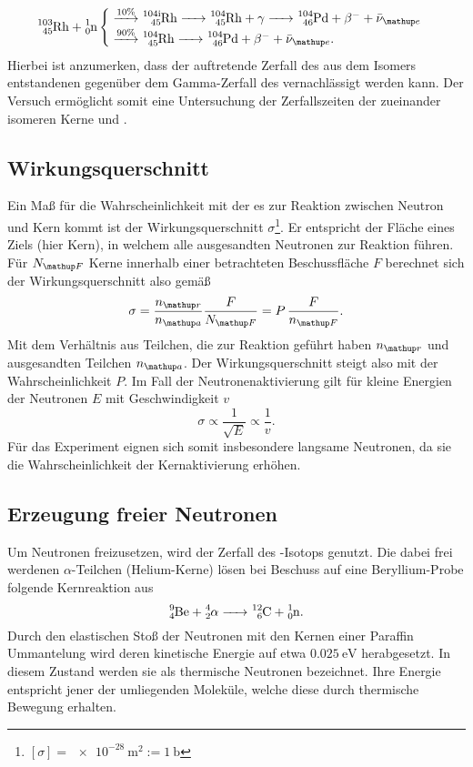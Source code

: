 \begin{equation}
\ce{^103_45 Rh + ^1_0 n} \begin{cases}
\overset{10\%}{\ce{->}} \ce{^{104i}_45 Rh -> ^{104}_45 Rh} + \gamma \ce{-> ^104_46 Pd} +  \beta^- + \bar{\nu}\ua{e}\\
\overset{90\%}{\ce{->}} \ce{^{104}_45 Rh ->  ^104_46 Pd} +  \beta^- + \bar{\nu}\ua{e}.
\end{cases}
\end{equation}
Hierbei ist anzumerken, dass der auftretende Zerfall des aus dem  Isomers entstandenen  gegenüber dem
Gamma-Zerfall des  vernachlässigt werden kann. Der Versuch ermöglicht somit eine Untersuchung der Zerfallszeiten
der zueinander isomeren Kerne  und .

\subsection{Wirkungsquerschnitt}
Ein Maß für die Wahrscheinlichkeit mit der es zur Reaktion zwischen Neutron und Kern kommt ist der Wirkungsquerschnitt
$\sigma$\footnote{$[\sigma] = \SI{e-28}{\meter^2} := \SI{1}{\barn}$}. Er entspricht
der Fläche eines Ziels (hier Kern), in welchem alle ausgesandten Neutronen zur Reaktion führen. Für $N\ua{F}$ Kerne innerhalb einer betrachteten Beschussfläche
$F$ berechnet sich der Wirkungsquerschnitt also gemäß
\begin{equation}
  \sigma = \frac{n\ua{r}}{n\ua{a}}\frac{F}{N\ua{F}} = P \,\frac{F}{n\ua{F}}.
\end{equation}
Mit dem Verhältnis aus Teilchen, die zur Reaktion geführt haben $n\ua{r}$ und ausgesandten Teilchen $n\ua{a}$. Der Wirkungsquerschnitt steigt also
mit der Wahrscheinlichkeit $P$. Im Fall der Neutronenaktivierung gilt für kleine Energien der Neutronen $E$ mit Geschwindigkeit $v$
\begin{equation}
  \sigma \propto \frac{1}{\sqrt{E}} \propto \frac{1}{v}.
\end{equation}
Für das Experiment eignen sich somit insbesondere langsame Neutronen, da sie die Wahrscheinlichkeit der Kernaktivierung erhöhen.

\subsection{Erzeugung freier Neutronen}
Um Neutronen freizusetzen, wird der Zerfall des -Isotops genutzt.
Die dabei frei werdenen $\alpha$-Teilchen (Helium-Kerne) lösen bei Beschuss auf eine Beryllium-Probe
folgende Kernreaktion aus
\begin{equation}
  \ce{^9_4 Be + ^4_2}\alpha \ce{-> ^12_6C + ^1_0 n}.
\end{equation}
Durch den elastischen Stoß der Neutronen mit den Kernen einer Paraffin Ummantelung wird deren kinetische Energie
auf etwa $\SI{0.025}{\eV}$ herabgesetzt. In diesem Zustand werden sie als thermische Neutronen bezeichnet. Ihre
Energie entspricht jener der umliegenden Moleküle, welche diese durch thermische Bewegung erhalten.

